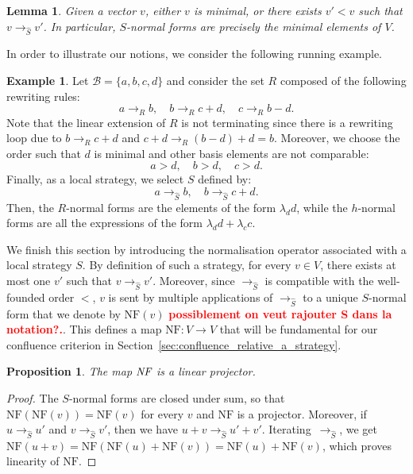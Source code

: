 \documentclass[10pt]{easychair}
\newtheorem{lemma}[theorem]{Lemma}
\newtheorem{proposition}[theorem]{Proposition}
\theoremstyle{definition}
\newtheorem{example}[theorem]{Example}
\newcommand\todo[1]{{\bf\textcolor{red}{#1.}}}
\newcommand\basis{\mathscr{B}}
\newcommand\rewR{\to_R}
\newcommand\rewS{\to_{\hat{S}}}
\newcommand\NF{\text{NF}}
\newcommand\NFF{\emph{NF}}
\begin{document}
\begin{lemma}\label{lem:h_normal_forms}
  Given a vector $v$, either $v$ is minimal, or there exists $v'<v$ such
  that $v\rewS v'$. In particular, $S$-normal forms are precisely the
  minimal elements of $V$. 
\end{lemma}
\smallskip

In order to illustrate our notions, we consider the following running
example.
\smallskip

\begin{example}\label{ex:h_norma_form}
  Let $\basis=\{a,b,c,d\}$ and consider the set $R$ composed of the
  following rewriting rules:
  \[a\rewR b,\quad b\rewR c+d,\quad c\rewR b-d.\]
  Note that the linear extension of $R$ is not terminating since there is
  a rewriting loop due to $b\rewR c+d$ and $c+d\rewR (b-d)+d=b$.
  Moreover, we choose the order such that $d$ is minimal and other basis
  elements are not comparable:
  \[a>d,\quad b>d,\quad c>d.\]
  Finally, as a local strategy, we select $S$ defined by:
  \[a\rewS b,\quad b\rewS c+d.\]
  Then, the $R$-normal forms are the elements of the form $\lambda_dd$,
  while the $h$-normal forms are all the expressions of the form
  $\lambda_dd+\lambda_cc$.
\end{example}
\smallskip

We finish this section by introducing the normalisation operator
associated with a local strategy $S$. By definition of such a strategy,
for every $v\in V$, there exists at most one $v'$ such that
$v\rewS v'$. Moreover, since $\rewS$ is compatible with the well-founded
order $<$, $v$ is sent by multiple applications of $\rewS$ to a unique
$S$-normal form that we denote by $\NF(v)$
\todo{possiblement on veut rajouter S dans la notation?}. This defines a map
$\NF:V\to V$  that will be fundamental for our confluence criterion in
Section~\ref{sec:confluence_relative_a_strategy}.
\medskip

\begin{proposition}\label{prop:linearity_of_H}
  The map $\NFF$ is a linear projector.
\end{proposition}

\begin{proof}
  The $S$-normal forms are closed under sum, so that $\NF(\NF(v))=\NF(v)$
  for every $v$ and $\NF$ is a projector. Moreover, if $u\rewS u'$
  and $v\rewS v'$, then we have $u+v\rewS u'+v'$. Iterating~$\rewS$, we
  get $\NF(u+v)=\NF(\NF(u)+\NF(v))=\NF(u)+\NF(v)$, which proves linearity
  of $\NF$.
\end{proof}
\end{document}

